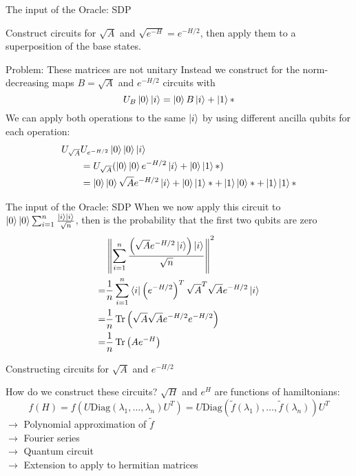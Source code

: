 \begin{frame}{The input of the Oracle: SDP}

 Construct circuits for $\sqrt{A}$ and $\sqrt{e^{-H}}=e^{-H/2}$, then apply them to a superposition of the base states.

\begin{block}{Problem: These matrices are not unitary}
Instead we construct for the norm-decreasing maps $B=\sqrt{A}$ and $e^{-H/2}$ circuits with
\begin{equation*}
U_B\ket{0}\ket{i}=\ket{0}B\ket{i}+\ket{1}*
\end{equation*}
\pause
We can apply both operations to the same $\ket{i}$ by using different ancilla qubits for each operation:
\begin{align*}
U_{\sqrt{A}}&U_{e^{-H/2}}\ket{0}\ket{0}\ket{i}\\
&=U_{\sqrt{A}}(\ket{0}\ket{0}e^{-H/2}\ket{i}+\ket{0}\ket{1}*)\\
&=\ket{0}\ket{0}\sqrt{A}e^{-H/2}\ket{i}+\ket{0}\ket{1}*+\ket{1}\ket{0}*+\ket{1}\ket{1}*
\end{align*}
\end{block}

\end{frame}

\begin{frame}{The input of the Oracle: SDP}
When we now apply this circuit to $\ket{0}\ket{0}\sum_{i=1}^n \frac{\ket{i}\ket{i}}{\sqrt{n}}$, then is the probability that the first two qubits are zero
\begin{align*}
&\left\|\sum_{i=1}^n\frac{\left(\sqrt{A}e^{-H/2}\ket{i}\right)\ket{i}}{\sqrt{n}}\right\|^2\\
=&\frac{1}{n}\sum_{i=1}^n \bra{i}\left(e^{-H/2}\right)^T\sqrt{A}^T\sqrt{A}e^{-H/2}\ket{i}\\
=&\frac{1}{n}\operatorname{Tr}\left(\sqrt{A}\sqrt{A}e^{-H/2}e^{-H/2}\right)\\
=&\frac{1}{n}\operatorname{Tr}\left(Ae^{-H}\right)
\end{align*}
\end{frame}

\begin{frame}{Constructing circuits for  $\sqrt{A}$ and $e^{-H/2}$}
\begin{block}{How do we construct these circuits?}
$\sqrt{H}$ and $e^{H}$ are functions of hamiltonians:
\begin{equation*}
f(H)=f(U \mathrm{Diag}(\lambda_1,\ldots, \lambda_n) U^T)=U \mathrm{Diag}(\tilde{f}(\lambda_1),\ldots,\tilde{f}(\lambda_n))U^T
\end{equation*}
$\to$ Polynomial approximation of $\tilde{f}$\\
$\to$ Fourier series \\
$\to$ Quantum circuit \\
$\to$ Extension to apply to hermitian matrices
\end{block}
\end{frame}

